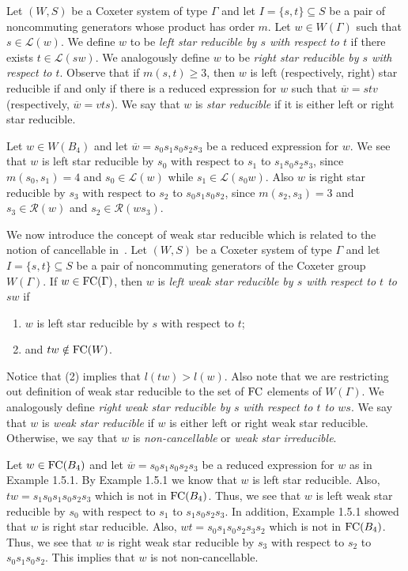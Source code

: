 Let $(W,S)$ be a Coxeter system of type $\Gamma$ and let $I=\{s,t\}\subseteq S$ be a pair of noncommuting generators whose product has order $m$. Let $w \in W(\Gamma)$ such that $s \in \mathcal{L}(w)$. We define $w$ to be \emph{left star reducible by $s$ with respect to $t$} if there exists $t \in \mathcal{L}(sw)$. We analogously define $w$ to be \emph{right star reducible by $s$ with respect to $t$}. Observe that if $m(s,t) \geq 3$, then $w$ is left (respectively, right) star reducible if and only if there is a reduced expression for $w$ such that $\overline{w}=stv$ (respectively, $\overline{w}=vts$). We say that $w$ is \emph{star reducible} if it is either left or right star reducible.

\begin{example}
Let $w \in W(B_4)$ and let $\overline{w}=s_0s_1s_0s_2s_3$ be a reduced expression for $w$. We see that $w$ is left star reducible by $s_0$ with respect to $s_1$ to $s_1s_0s_2s_3$, since $m(s_0,s_1)=4$ and $s_0 \in \mathcal{L}(w)$ while $s_1 \in \mathcal{L}(s_0w)$. Also $w$ is right star reducible by $s_3$ with respect to $s_2$ to $s_0s_1s_0s_2$, since $m(s_2,s_3)=3$ and $s_3 \in \mathcal{R}(w)$ and $s_2 \in \mathcal{R}(ws_3)$.
\end{example}
 
We now introduce the concept of weak star reducible which is related to the notion of cancellable in~\cite{Fan1997}. Let $(W,S)$ be a Coxeter system of type $\Gamma$ and let $I=\{s,t\} \subseteq S$ be a pair of noncommuting generators of the Coxeter group $W(\Gamma)$. If $w  \in \mathrm{FC}(\Gamma)$, then $w$ is \emph{left weak star reducible by $s$ with respect to $t$ to $sw$} if
\begin{enumerate}
\item $w$ is left star reducible by $s$ with respect to $t$;
\item and $tw \notin \mathrm{FC}(W)$.	
\end{enumerate}
Notice that (2) implies that $l(tw)>l(w)$. Also note that we are restricting out definition of weak star reducible to the set of $\mathrm{FC}$ elements of $W(\Gamma)$. We analogously define \emph{right weak star reducible by $s$ with respect to $t$ to $ws$}. We say that $w$ is \emph{weak star reducible} if $w$ is either left or right weak star reducible. Otherwise, we say that $w$ is \emph{non-cancellable} or \emph{weak star irreducible}.

\begin{example}
Let $w \in \mathrm{FC}(B_4)$ and let $\overline{w}=s_0s_1s_0s_2s_3$ be a reduced expression for $w$ as in Example 1.5.1. By Example 1.5.1 we know that $w$ is left star reducible. Also, $tw=s_1s_0s_1s_0s_2s_3$ which is not in $\mathrm{FC}(B_4)$. Thus, we see that $w$ is left weak star reducible by $s_0$ with respect to $s_1$ to $s_1s_0s_2s_3$. In addition, Example 1.5.1 showed that $w$ is right star reducible. Also, $wt=s_0s_1s_0s_2s_3s_2$ which is not in $\mathrm{FC}(B_4)$. Thus, we see that $w$ is right weak star reducible by $s_3$ with respect to $s_2$ to $s_0s_1s_0s_2$. This implies that $w$ is not non-cancellable.
\end{example}


